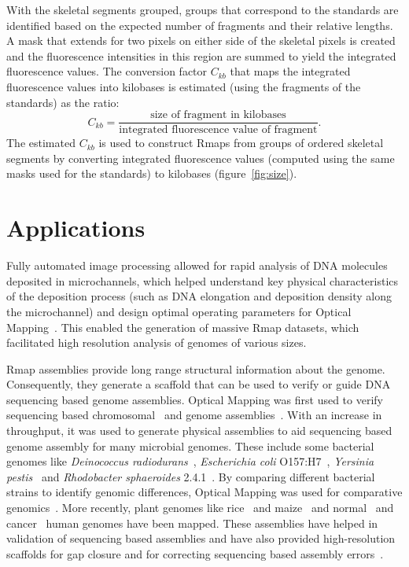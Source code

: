 \documentclass{bmcart}
\begin{document}
With the skeletal segments grouped, groups that correspond to the standards 
are identified based on the expected number of fragments and their relative 
lengths. A mask that extends for two pixels on either side of 
the skeletal pixels is created and the fluorescence intensities in this region 
are summed to yield the integrated fluorescence values. The conversion factor 
$C_{kb}$ that maps the integrated fluorescence values into kilobases is 
estimated (using the fragments of the standards) as the ratio:
\begin{equation}
C_{kb} = \frac{\mbox{size of fragment in kilobases}}
              {\mbox{integrated fluorescence value of fragment}}.
\end{equation} 
The estimated $C_{kb}$ is used to construct Rmaps from groups of ordered 
skeletal segments by converting integrated fluorescence values (computed using 
the same masks used for the standards) to kilobases (figure~\ref{fig:size}). 


\section*{Applications}
Fully automated image processing allowed for rapid analysis of DNA molecules 
deposited in microchannels, which helped understand key physical 
characteristics of the deposition process (such as DNA elongation and 
deposition density along the microchannel) and design optimal operating parameters 
for Optical Mapping~\cite{Dimalanta2004}. This enabled the generation of 
massive Rmap datasets, which facilitated high resolution analysis of genomes 
of various sizes.
   
Rmap assemblies provide long range structural information about the genome. Consequently, they generate a scaffold that can be used to verify or guide DNA sequencing based genome assemblies. Optical Mapping was first used to verify sequencing based chromosomal~\cite{Jing1999} and genome 
assemblies~\cite{Lin1999}. With an increase in throughput, it was used to 
generate physical assemblies to aid sequencing based genome assembly for many microbial genomes. These include some bacterial genomes like \emph{Deinococcus 
radiodurans}~\cite{Lin1999}, \emph{Escherichia coli} O157:H7~\cite{Lim2001}, 
\emph{Yersinia pestis}~\cite{Zhou2002} and \emph{Rhodobacter 
sphaeroides} 2.4.1~\cite{Zhou2003}. By comparing different bacterial strains to identify genomic differences, Optical Mapping was used for comparative 
genomics~\cite{Zhou2004}. More recently, plant genomes like 
rice~\cite{Zhou2007} and maize~\cite{Zhou2009, Wei2009} and 
normal~\cite{Teague2010} and cancer~\cite{Ray2013} human genomes have 
been mapped. These assemblies have helped in validation of sequencing based 
assemblies and have also provided high-resolution scaffolds for gap closure 
and for correcting sequencing based assembly errors~\cite{Reslewic2005}. 
\end{document}
